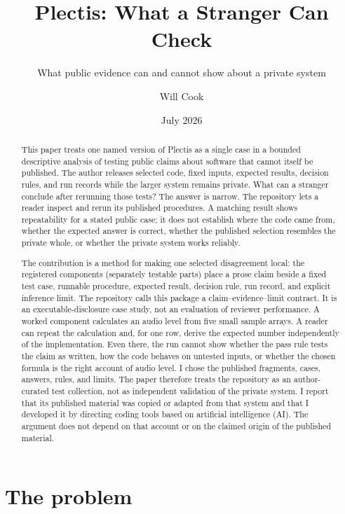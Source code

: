 \documentclass[11pt]{article}
\title{Plectis: What a Stranger Can Check}
\subtitle{What public evidence can and cannot show about a private system}
\author{Will Cook}
\date{July 2026}
\begin{document}
\maketitle

\paperprovenance

\begin{abstract}
This paper treats one named version of Plectis as a single case in a bounded
descriptive analysis of testing public claims about software that cannot itself
be published.  The author releases selected code, fixed inputs, expected
results, decision rules, and run records while the larger system remains
private.  What can a stranger conclude after rerunning those tests?  The answer
is narrow.  The repository lets a reader inspect and rerun its published
procedures.  A matching result shows repeatability for a stated public case; it
does not establish where the code came from, whether the expected answer is
correct, whether the published selection resembles the private whole, or
whether the private system works reliably.

The contribution is a method for making one selected disagreement local: the
registered components (separately testable parts) place a prose claim beside a
fixed test case, runnable procedure, expected result, decision rule, run
record, and explicit inference limit.  The repository calls this package a
claim--evidence--limit contract.  It is an executable-disclosure case study,
not an evaluation of reviewer performance.  A worked component calculates an
audio level from five small sample arrays.  A reader can repeat the calculation and,
for one row, derive the expected number independently of the implementation.
Even there, the run cannot show whether the pass rule tests the claim as
written, how the code behaves on untested inputs, or whether the chosen formula
is the right account of audio level.  I chose the published fragments, cases,
answers, rules, and limits.  The paper therefore treats the repository as an
author-curated test collection, not as independent validation of the private
system.  I report that its published material was copied or adapted from that
system and that I developed it by directing coding tools based on artificial
intelligence (AI).  The argument does not depend on that account or on the
claimed origin of the published material.
\end{abstract}

\section{The problem}
\label{sec:problem}
\end{document}
